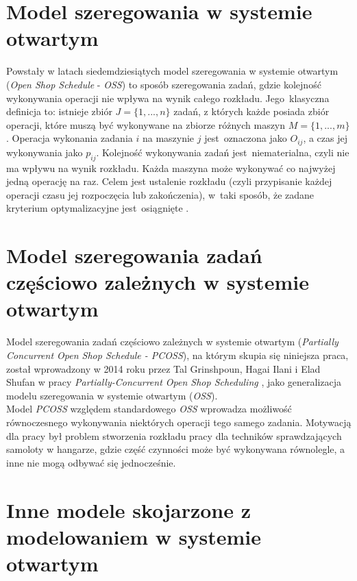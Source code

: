 \documentclass[brudnopis]{xmgr}
\begin{document}
\section{Model szeregowania w systemie otwartym}
\medskip

Powstały w latach siedemdziesiątych model szeregowania w systemie otwartym (\emph{Open Shop Schedule} - \emph{OSS}) to sposób szeregowania zadań, gdzie kolejność wykonywania operacji nie wpływa na wynik całego rozkładu. Jego~klasyczna definicja to: istnieje zbiór $J=\{1, ..., n\}$ zadań, z których każde posiada zbiór operacji, które muszą być wykonywane na zbiorze różnych maszyn $M=\{1, ..., m\}$. Operacja wykonania zadania $i$ na maszynie $j$ jest~oznaczona jako $O_{ij}$, a czas jej wykonywania jako $p_{ij}$.
Kolejność wykonywania zadań jest~niematerialna, czyli nie ma wpływu na wynik rozkładu. Każda maszyna może wykonywać co najwyżej jedną operację na raz. Celem jest ustalenie rozkładu (czyli przypisanie każdej operacji czasu jej rozpoczęcia lub zakończenia), w~taki sposób, że zadane kryterium optymalizacyjne jest~osiągnięte \cite{ahmadian2020four}.


\section{Model szeregowania zadań częściowo zależnych w systemie otwartym}

Model szeregowania zadań częściowo zależnych w systemie otwartym (\emph{Partially Concurrent Open Shop Schedule - PCOSS}), na którym skupia się niniejsza praca, został wprowadzony w 2014 roku przez Tal Grinshpoun, Hagai Ilani i Elad Shufan w pracy \emph{Partially-Concurrent Open Shop Scheduling} \cite{grinshpoun2014partially}, jako generalizacja modelu szeregowania w systemie otwartym (\emph{OSS}).\\
Model \emph{PCOSS} względem standardowego \emph{OSS} wprowadza możliwość równoczesnego wykonywania niektórych operacji tego samego zadania. Motywacją dla pracy był problem stworzenia rozkładu pracy dla techników sprawdzających samoloty w hangarze, gdzie część czynności może być wykonywana równolegle, a inne nie mogą odbywać się jednocześnie.


\section{Inne modele skojarzone z modelowaniem w systemie otwartym}
\end{document}
